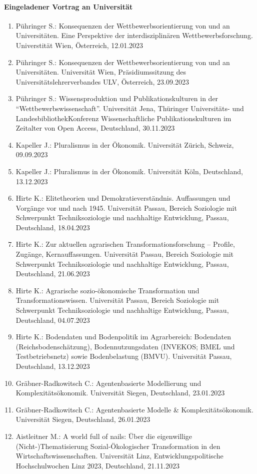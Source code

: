 \paragraph{Eingeladener Vortrag an Universität}
\begin{enumerate}
	\item Pühringer S.: Konsequenzen der Wettbewerbsorientierung von und an Universitäten. Eine Perspektive der interdisziplinären Wettbewerbsforschung. Universtität Wien, Österreich, 12.01.2023
	\item Pühringer S.: Konsequenzen der Wettbewerbsorientierung von und an Universitäten. Universität Wien, Präsidiumssitzung des Universitätslehrerverbandes ULV, Österreich, 23.09.2023
	\item Pühringer S.: Wissensproduktion und Publikationskulturen in der “Wettbewerbswissenschaft”. Universität Jena, Thüringer Universitäts- und LandesbibliothekKonferenz Wissenschaftliche Publikationskulturen im Zeitalter von Open Access, Deutschland, 30.11.2023
	\item Kapeller J.: Pluralismus in der Ökonomik. Universität Zürich, Schweiz, 09.09.2023
	\item Kapeller J.: Pluralismus in der Ökonomik. Universität Köln, Deutschland, 13.12.2023
	\item Hirte K.: Elitetheorien und Demokratieverständnis. Auffassungen und Vorgänge vor und nach 1945. Universität Passau, Bereich Soziologie mit Schwerpunkt Techniksoziologie und nachhaltige Entwicklung, Passau, Deutschland, 18.04.2023
	\item Hirte K.: Zur aktuellen agrarischen Transformationsforschung – Profile, Zugänge, Kernauffassungen. Universität Passau, Bereich Soziologie mit Schwerpunkt Techniksoziologie und nachhaltige Entwicklung, Passau, Deutschland, 21.06.2023
	\item Hirte K.: Agrarische sozio-ökonomische Transformation und Transformationswissen. Universität Passau, Bereich Soziologie mit Schwerpunkt Techniksoziologie und nachhaltige Entwicklung, Passau, Deutschland, 04.07.2023
	\item Hirte K.: Bodendaten und Bodenpolitik im Agrarbereich: Bodendaten (Reichsbodenschätzung), Bodennutzungsdaten (INVEKOS; BMEL und Testbetriebsnetz) sowie Bodenbelastung (BMVU). Universität Passau, Deutschland, 13.12.2023
	\item Gräbner-Radkowitsch C.: Agentenbasierte Modellierung und Komplexitätsökonomik. Universität Siegen, Deutschland, 23.01.2023
	\item Gräbner-Radkowitsch C.: Agentenbasierte Modelle & Komplexitätsökonomik. Universität Siegen, Deutschland, 26.01.2023
	\item Aistleitner M.: A world full of nails: Über die eigenwillige (Nicht-)Thematisierung Sozial-Ökologischer Transformation in den Wirtschaftswissenschaften. Universität Linz, Entwicklungspolitische Hochschulwochen Linz 2023, Deutschland, 21.11.2023
\end{enumerate}
